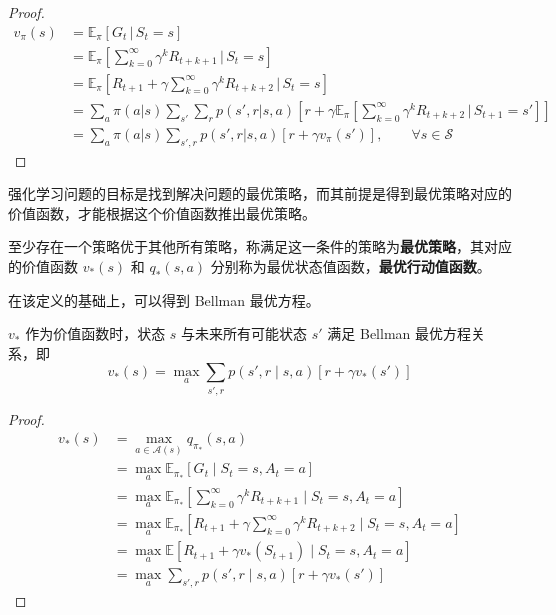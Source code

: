 \begin{proof}
    \[
    \begin{aligned} v_\pi(s) & = \mathbb{E}_\pi[G_t\,|\,S_t=s] \\ &=\mathbb{E}_\pi \left[\sum_{k=0}^\infty\gamma^kR_{t+k+1}\,|\,S_t=s \right] \\ &= \mathbb{E}_\pi \left [R_{t+1}+\gamma\sum_{k=0}^\infty\gamma^kR_{t+k+2}\,|\,S_t=s \right] \\ &=\sum_a\pi(a|s)\sum_{s'}\sum_rp(s',r|s,a)\left[r+\gamma \mathbb{E}_\pi \left[\sum_{k=0}^\infty\gamma^kR_{t+k+2}\,|\,S_{t+1}=s' \right] \right] \\ &= \sum_a\pi(a|s)\sum_{s',r}p(s',r|s,a)\left[r+\gamma v_\pi(s') \right], \qquad \forall s \in \mathcal S \end{aligned}
    \]
\end{proof}

强化学习问题的目标是找到解决问题的最优策略，而其前提是得到最优策略对应的价值函数，才能根据这个价值函数推出最优策略。

\begin{Definition}
    至少存在一个策略优于其他所有策略，称满足这一条件的策略为\textbf{最优策略}，其对应的价值函数 $v_*(s)$ 和 $q_*(s,a)$ 分别称为{最优状态值函数}，\textbf{最优行动值函数}。
\end{Definition}

在该定义的基础上，可以得到 Bellman 最优方程\cite{howard1960dynamic}。

\begin{Theorem}
    $v_*$ 作为价值函数时，状态 $s$ 与未来所有可能状态 $s'$ 满足 Bellman 最优方程关系，即
    \begin{equation}
        v_*(s)=\max_{a}\sum_{s',r}p(s',r \mid s,a)[r+\gamma v_*(s')]
    \end{equation}
\end{Theorem}

\begin{proof}
     \[
    \begin{aligned}v_*(s) &= \max_{a\in \mathcal A(s)}q_{\pi_*}(s,a) \\ &=\max_a \mathbb{E}_{\pi_*} \left[G_t \mid S_t=s, A_t=a \right] \\ &= \max_a \mathbb{E}_{\pi_*} \left[\sum_{k=0}^\infty \gamma^kR_{t+k+1} \mid S_t=s,A_t=a \right] \\ &= \max_a \mathbb{E}_{\pi_*} \left[R_{t+1}+\gamma \sum_{k=0}^\infty\gamma^kR_{t+k+2}\mid S_t=s,A_t=a \right] \\ &= \max_a \mathbb{E}[R_{t+1}+\gamma v_*(S_{t+1}) \mid S_t=s,A_t=a] \\ &=\max_{a}\sum_{s',r}p(s',r \mid s,a)[r+\gamma v_*(s')]\end{aligned}
    \]
\end{proof}

